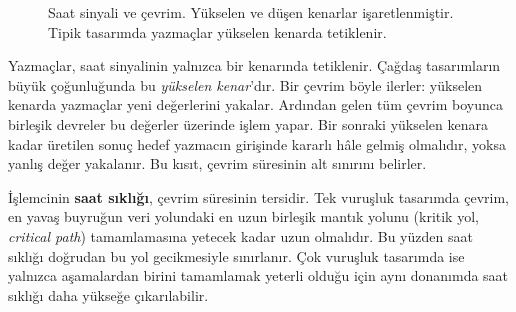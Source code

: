 \begin{figure}[htbp]
\centering
{}
\caption[Saat sinyali ve çevrim]{Saat sinyali ve çevrim. Yükselen ve düşen kenarlar işaretlenmiştir. Tipik tasarımda yazmaçlar yükselen kenarda tetiklenir.}
\label{fig:saat-vurusu}
\end{figure}

Yazmaçlar, saat sinyalinin yalnızca bir kenarında tetiklenir. Çağdaş tasarımların büyük çoğunluğunda bu \emph{yükselen kenar}'dır. Bir çevrim böyle ilerler: yükselen kenarda yazmaçlar yeni değerlerini yakalar. Ardından gelen tüm çevrim boyunca birleşik devreler bu değerler üzerinde işlem yapar. Bir sonraki yükselen kenara kadar üretilen sonuç hedef yazmacın girişinde kararlı hâle gelmiş olmalıdır, yoksa yanlış değer yakalanır. Bu kısıt, çevrim süresinin alt sınırını belirler.

İşlemcinin \textbf{saat sıklığı}, çevrim süresinin tersidir. Tek vuruşluk tasarımda çevrim, en yavaş buyruğun veri yolundaki en uzun birleşik mantık yolunu (kritik yol, \emph{critical path}) tamamlamasına yetecek kadar uzun olmalıdır. Bu yüzden saat sıklığı doğrudan bu yol gecikmesiyle sınırlanır. Çok vuruşluk tasarımda ise yalnızca aşamalardan birini tamamlamak yeterli olduğu için aynı donanımda saat sıklığı daha yükseğe çıkarılabilir.

